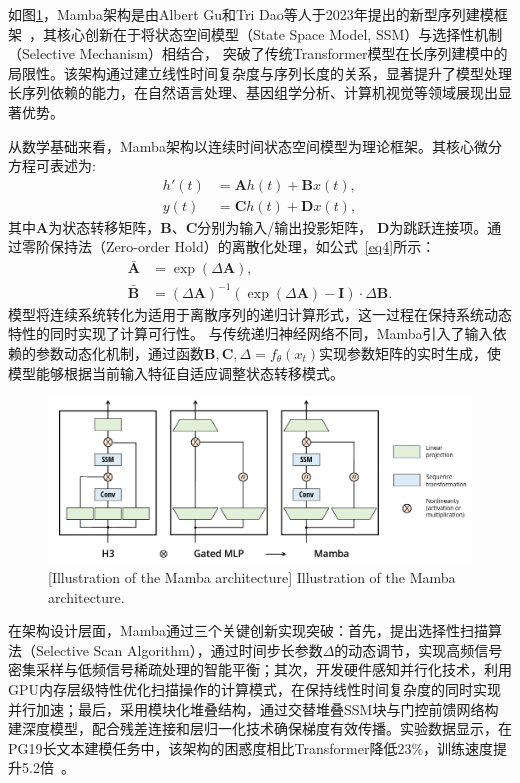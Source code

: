 如图\ref{figure1: Mamba架构示意图}，Mamba架构是由Albert Gu和Tri Dao等人于2023年提出的新型序列建模框架~\cite{gu2023mamba}，其核心创新在于将状态空间模型（State Space Model, SSM）与选择性机制（Selective Mechanism）相结合，
突破了传统Transformer模型在长序列建模中的局限性。该架构通过建立线性时间复杂度与序列长度的关系，显著提升了模型处理长序列依赖的能力，在自然语言处理、基因组学分析、计算机视觉等领域展现出显著优势。

从数学基础来看，Mamba架构以连续时间状态空间模型为理论框架。其核心微分方程可表述为:
\begin{equation}
\begin{aligned}
    h'(t)&=\mathbf{A}h(t)+\mathbf{B}x(t),\\
    y(t)&=\mathbf{C}h(t) +\mathbf{D}x(t),
\end{aligned}
\label{eq3}
\end{equation}
其中$\mathbf{A}$为状态转移矩阵，$\mathbf{B}$、$\mathbf{C}$分别为输入/输出投影矩阵， $\mathbf{D}$为跳跃连接项。通过零阶保持法（Zero-order Hold）的离散化处理，如公式~\ref{eq4}所示：
\begin{equation}
\begin{aligned}
    \mathbf{\bar{A}}&=\exp(\Delta\mathbf{A}),\\
    \mathbf{\bar{B}}&=(\Delta\mathbf{A})^{-1}(\exp(\Delta\mathbf{A})-\mathbf{I})\cdot\Delta\mathbf{B}.
\end{aligned}
\label{eq4}
\end{equation}
模型将连续系统转化为适用于离散序列的递归计算形式，这一过程在保持系统动态特性的同时实现了计算可行性。
与传统递归神经网络不同，Mamba引入了输入依赖的参数动态化机制，通过函数$\mathbf{B},\mathbf{C},\Delta=f_\theta(x_t)$实现参数矩阵的实时生成，使模型能够根据当前输入特征自适应调整状态转移模式。

\begin{figure}[h]
    \centering
    \includegraphics[width=1.0\columnwidth]{figures/RelatedWork/Mamba架构.png}
    [Illustration of the Mamba architecture]{ Illustration of the Mamba architecture.~\cite{gu2023mamba}}
    \label{figure1: Mamba架构示意图}
\end{figure}
在架构设计层面，Mamba通过三个关键创新实现突破：首先，提出选择性扫描算法（Selective Scan Algorithm），通过时间步长参数$\Delta$的动态调节，实现高频信号密集采样与低频信号稀疏处理的智能平衡；其次，开发硬件感知并行化技术，利用GPU内存层级特性优化扫描操作的计算模式，在保持线性时间复杂度的同时实现并行加速；最后，采用模块化堆叠结构，通过交替堆叠SSM块与门控前馈网络构建深度模型，配合残差连接和层归一化技术确保梯度有效传播。实验数据显示，在PG19长文本建模任务中，该架构的困惑度相比Transformer降低23\%，训练速度提升5.2倍~\cite{gu2023mamba}。

